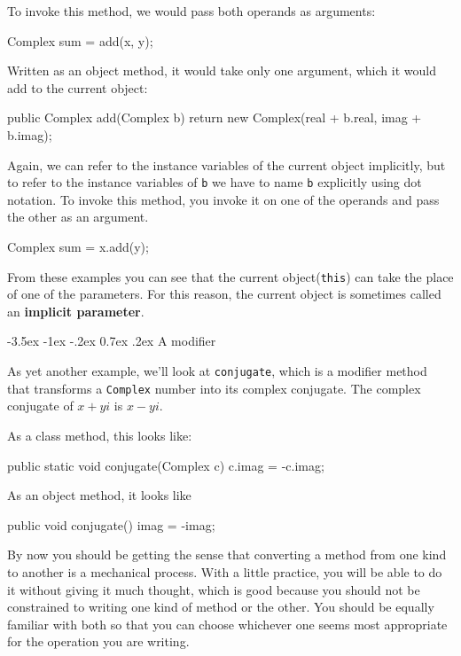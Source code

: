 \documentclass{book}
\makeatletter
\renewcommand{\section}{\@startsection 
    {section} {1} {0mm}%
    {-3.5ex \@plus -1ex \@minus -.2ex}%
    {0.7ex \@plus.2ex}%
    {\normalfont\Large\bfseries}}
\makeatother
\begin{document}
To invoke this method, we would pass both operands as arguments:

\begin{verbatimtab}
    Complex sum = add(x, y);
\end{verbatimtab}

Written as an object method, it would take only one argument,
which it would add to the current object:

\begin{verbatimtab}
public Complex add(Complex b) {
    return new Complex(real + b.real, imag + b.imag);
}
\end{verbatimtab}

Again, we can refer to the instance variables of the current
object implicitly, but to refer to the instance variables of
{\tt b} we have to name {\tt b} explicitly using dot notation.
To invoke this method, you invoke it on one of the operands
and pass the other as an argument.


\begin{verbatimtab}
    Complex sum = x.add(y);
\end{verbatimtab}

From these examples you can see that the current object({\tt this})
can take the place of one of the parameters.  For this reason,
the current object is sometimes called an {\bf implicit parameter}.


\section{A modifier}

As yet another example, we'll look at {\tt conjugate}, which is
a modifier method that transforms a {\tt Complex} number into
its complex conjugate.  The complex conjugate of $x + yi$ is
$x - yi$.

As a class method, this looks like:

\begin{verbatimtab}
public static void conjugate(Complex c) {
    c.imag = -c.imag;
}
\end{verbatimtab}

As an object method, it looks like

\begin{verbatimtab}
public void conjugate() {
    imag = -imag;
}
\end{verbatimtab}

By now you should be getting the sense that converting a method
from one kind to another is a mechanical process.  With a little
practice, you will be able to do it without giving it much
thought, which is good because you should not be constrained to
writing one kind of method or the other.  You should be equally
familiar with both so that you can choose whichever one seems
most appropriate for the operation you are writing.
\end{document}
